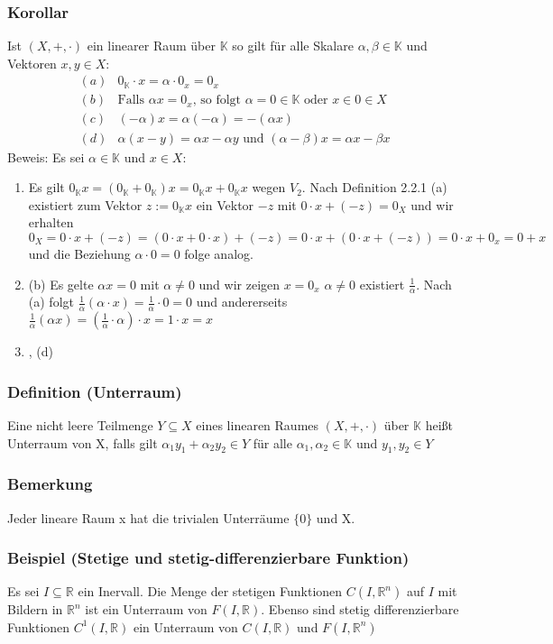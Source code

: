 \subsubsection{Korollar}
Ist $(X,+,\cdot )$ ein linearer Raum über $\mathbb{K}$ so gilt für alle Skalare $\alpha ,\beta \in\mathbb{K}$ und Vektoren $x,y\in X$:
\begin{align*}
(a)& 0_{\mathbb{K}} \cdot x = \alpha \cdot 0_x = 0_x\\
(b)& \text{Falls }\alpha x = 0_x\text{, so folgt } \alpha = 0\in\mathbb{K} \text{ oder } x\in 0 \in X \\
(c)& (-\alpha )x = \alpha (-\alpha )=-(\alpha x)\\
(d)& \alpha (x-y) = \alpha x - \alpha y \text{ und } (\alpha - \beta )x = \alpha x - \beta x
\end{align*}
Beweis: Es sei $\alpha \in \mathbb{K}$ und $x\in X$:
\renewcommand{\labelenumi}{(\alph{enumi})}
\begin{enumerate}
\item Es gilt $0_{\mathbb{K}} x = (0_{\mathbb{K}}+0_{\mathbb{K}})x = 0_{\mathbb{K}}x + 0_{\mathbb{K}}x$ wegen $V_2$. Nach Definition 2.2.1 (a) existiert zum Vektor $z:=0_{\mathbb{K}} x$ ein Vektor $-z$ mit $0\cdot x + (-z)=0_X$ und wir erhalten $0_X=0\cdot x + (-z) = (0\cdot x + 0\cdot x)+(-z) = 0\cdot x +(0\cdot x + (-z)) = 0\cdot x + 0_x = 0+x$ und die Beziehung $\alpha \cdot 0 = 0$ folge analog.
\item (b) Es gelte $\alpha x = 0$ mit $\alpha \neq 0$ und wir zeigen $x=0_x$ $\alpha \neq 0$ existiert $\frac{1}{\alpha}$. Nach (a) folgt ${\frac{1}{\alpha}} (\alpha \cdot x) = \frac{1}{\alpha} \cdot 0=0$ und andererseits $\frac{1}{\alpha} (\alpha x) = (\frac{1}{\alpha} \cdot \alpha) \cdot x=1\cdot x = x$
\item , (d)
\end{enumerate}
\subsubsection{Definition (Unterraum)}
Eine nicht leere Teilmenge $Y \subseteq X$ eines linearen Raumes $(X,+,\cdot)$ über $\mathbb{K}$ heißt Unterraum von X, falls gilt $\alpha_1 y_1 + \alpha_2 y_2 \in Y$ für alle $\alpha_1, \alpha_2\in\mathbb{K}$ und $y_1, y_2\in Y$
\subsubsection{Bemerkung}
Jeder lineare Raum x hat die trivialen Unterräume $\{0\}$ und X.
\subsubsection{Beispiel (Stetige und stetig-differenzierbare Funktion)}
Es sei $I\subseteq \mathbb{R}$ ein Inervall. Die Menge der stetigen Funktionen $C(I,\mathbb{R}^n)$ auf $I$ mit Bildern in $\mathbb{R}^n$ ist ein Unterraum von $F(I,\mathbb{R})$. Ebenso sind stetig differenzierbare Funktionen $C^1(I,\mathbb{R})$ ein Unterraum von $C(I,\mathbb{R})$ und $F(I,\mathbb{R}^n)$
